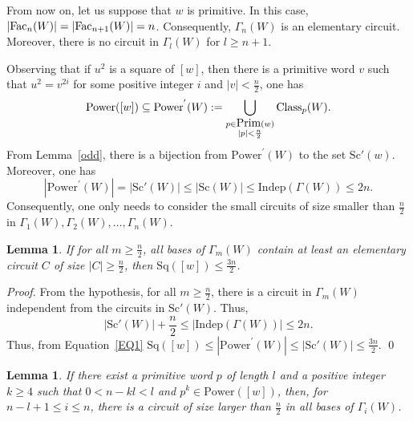 \documentclass[runningheads,envcountsame,a4paper]{llncs}
\newtheorem{lem}[thm]{Lemma}
\newcommand{\fac}{\hbox{\rm Fac}}
\newcommand{\Class}{\hbox{\rm Class}}
\newcommand{\prim}{\hbox{\rm Prim}}
\newcommand{\pow}{\mathrm{Power}}
\newcommand{\sq}{\mathrm{Sq}}
\newcommand{\indep}{\mathrm{Indep}}
\renewcommand{\sc}{\mathrm{Sc}}
\begin{document}
From now on, let us suppose that $w$ is primitive. In this case, $|\fac_n(W)|=|\fac_{n+1}(W)|=n$. Consequently, $\Gamma_n(W)$ is an elementary circuit. Moreover, there is no circuit in $\Gamma_l(W)$ for $l\geq n+1$.

Observing that if $u^2$ is a square of $[w]$, then there is a primitive word $v$ such that $u^2=v^{2i}$ for some positive integer $i$ and $|v|< \frac{n}{2}$, one has
$$\pow([w])\subseteq \pow^{'}(W):=\bigcup_{\substack{p\in\prim(w)\\|p|< \frac{n}{2}}}\Class_p(W).$$
From Lemma~\ref{odd}, there is a bijection from $\pow^{'}(W)$ to the set $\sc'(w)$. Moreover, one has
\begin{equation} \label{EQ1}
|\pow^{'}(W)| = |\sc'(W)| \leq |\sc(W)| \leq \indep(\Gamma(W)) \leq 2n.
\end{equation}
Consequently, one only needs to consider the small circuits of size smaller than $\frac{n}{2}$ in $\Gamma_1(W),\Gamma_2(W), \ldots, \Gamma_n(W)$.


\begin{lem}\label{Case1}
If for all $m\geq\frac{n}{2}$, all bases of $\Gamma_m(W)$ contain at least an elementary circuit $C$ of size $|C| \geq \frac{n}{2}$, then $\sq([w])\leq \frac{3n}{2}$.
\end{lem}

\begin{proof}
From the hypothesis, for all $m\geq\frac{n}{2}$, there is a circuit in $\Gamma_m(W)$ independent from the circuits in $\sc'(W)$. Thus,
$$|\sc'(W)|+\frac{n}{2} \leq |\indep(\Gamma(W))|\leq 2n.$$
Thus, from Equation~\ref{EQ1} 
$\sq([w]) \leq |\pow^{'}(W)| \leq |\sc'(W)| \leq \frac{3n}{2}$. \qed
\end{proof}

\begin{lem}\label{distinct}
If there exist a primitive word $p$ of length $l$ and a positive integer $k\geq 4$ such that $0<n-kl <l$ and $p^k \in \pow([w])$, 
then, for $n-l+1 \leq i \leq n$, there is a circuit of size larger than $\frac{n}{2}$ in all bases of $\Gamma_i(W)$.
\end{lem}
\end{document}

